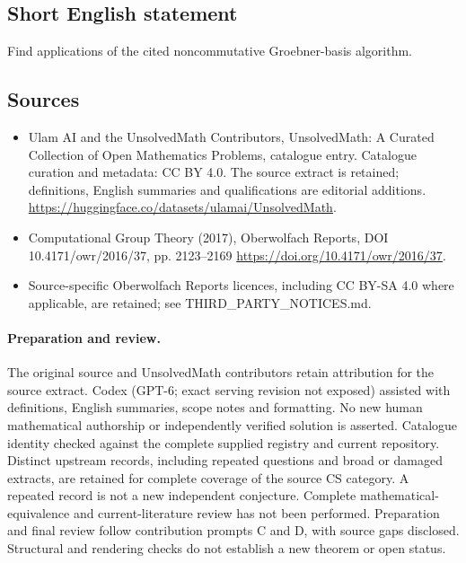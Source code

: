 \documentclass[11pt]{article}
\begin{document}
\subsection{Short English statement}
Find applications of the cited noncommutative Groebner-basis algorithm.
\subsection{Sources}
\begin{itemize}
\item[\hypertarget{source:statement:1}{S1}] Ulam AI and the UnsolvedMath Contributors, UnsolvedMath: A Curated Collection of Open Mathematics Problems, catalogue entry. Catalogue curation and metadata: CC BY 4.0. The source extract is retained; definitions, English summaries and qualifications are editorial additions.
\url{https://huggingface.co/datasets/ulamai/UnsolvedMath}.
\item[\hypertarget{source:statement:2}{S2}] Computational Group Theory (2017), Oberwolfach Reports, DOI 10.4171/owr/2016/37, pp. 2123--2169
\url{https://doi.org/10.4171/owr/2016/37}.
\item Source-specific Oberwolfach Reports licences, including CC BY-SA 4.0 where applicable, are retained; see THIRD\_PARTY\_NOTICES.md.
\end{itemize}
\paragraph{Preparation and review.}
The original source and UnsolvedMath contributors retain attribution for the source extract. Codex (GPT-6; exact serving revision not exposed) assisted with definitions, English summaries, scope notes and formatting. No new human mathematical authorship or independently verified solution is asserted. Catalogue identity checked against the complete supplied registry and current repository. Distinct upstream records, including repeated questions and broad or damaged extracts, are retained for complete coverage of the source CS category. A repeated record is not a new independent conjecture. Complete mathematical-equivalence and current-literature review has not been performed. Preparation and final review follow contribution prompts C and D, with source gaps disclosed. Structural and rendering checks do not establish a new theorem or open status.
\label{end:statement}
\end{document}
